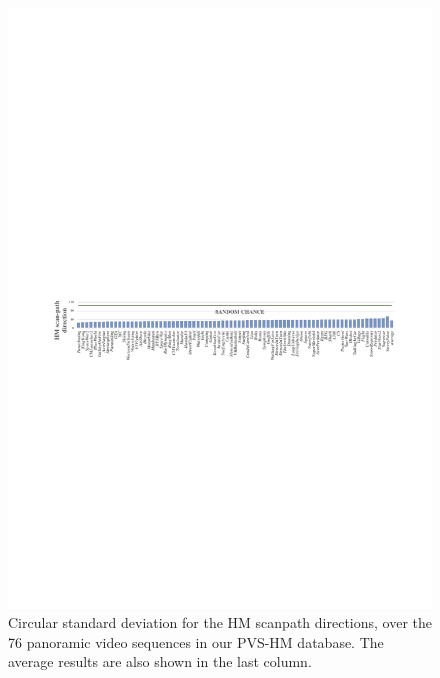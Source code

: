 \documentclass[10pt,journal,compsoc]{IEEEtran}
\begin{document}
\begin{figure}
\vspace{-3em}
	\begin{center}
		\centerline{\includegraphics[width=2\columnwidth]{figures/database/direction-consistence}}%
         \vspace{-1em}
		\caption{\footnotesize{Circular standard deviation for the HM scanpath directions, over the 76 panoramic video sequences in our PVS-HM database. The average results are also shown in the last column.}}
		\label{direction-consistence}
	\end{center}
\vspace{-2em}
\end{figure}
\end{document}
